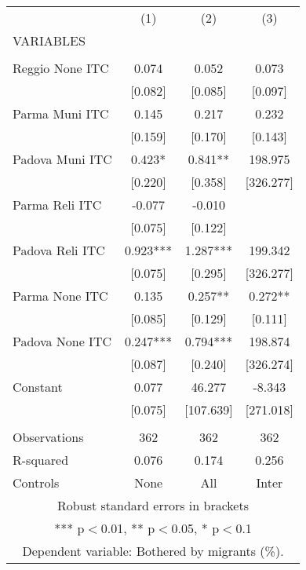 \begin{tabular}{lccc} \hline
 & (1) & (2) & (3) \\
VARIABLES &  &  &  \\ \hline
 &  &  &  \\
Reggio None ITC & 0.074 & 0.052 & 0.073 \\
 & [0.082] & [0.085] & [0.097] \\
Parma Muni ITC & 0.145 & 0.217 & 0.232 \\
 & [0.159] & [0.170] & [0.143] \\
Padova Muni ITC & 0.423* & 0.841** & 198.975 \\
 & [0.220] & [0.358] & [326.277] \\
Parma Reli ITC & -0.077 & -0.010 &  \\
 & [0.075] & [0.122] &  \\
Padova Reli ITC & 0.923*** & 1.287*** & 199.342 \\
 & [0.075] & [0.295] & [326.277] \\
Parma None ITC & 0.135 & 0.257** & 0.272** \\
 & [0.085] & [0.129] & [0.111] \\
Padova None ITC & 0.247*** & 0.794*** & 198.874 \\
 & [0.087] & [0.240] & [326.274] \\
Constant & 0.077 & 46.277 & -8.343 \\
 & [0.075] & [107.639] & [271.018] \\
 &  &  &  \\
Observations & 362 & 362 & 362 \\
R-squared & 0.076 & 0.174 & 0.256 \\
 Controls & None & All & Inter \\ \hline
\multicolumn{4}{c}{ Robust standard errors in brackets} \\
\multicolumn{4}{c}{ *** p$<$0.01, ** p$<$0.05, * p$<$0.1} \\
\multicolumn{4}{c}{ Dependent variable: Bothered by migrants (\%).} \\
\end{tabular}
